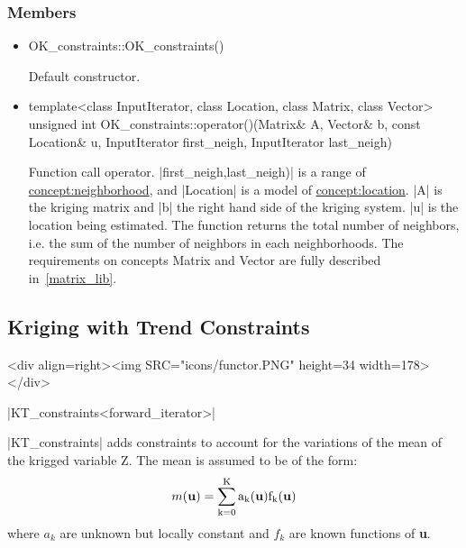 \documentclass[12pt,twoside]{report}
\newcommand{\loc}[1]{{\bf #1}}
\newcommand{\mloc}[1]{\rm{\bf #1}}
\begin{document}
 
\htmlrule[CLEAR=all]  \subsubsection*{Members}
\begin{itemize}

\item
 \begin{code} 
OK_constraints::OK_constraints()
\end{code}

Default constructor.

\item
 \begin{code} 
template<class InputIterator, class Location, class Matrix, class Vector>
unsigned int
OK_constraints::operator()(Matrix& A, Vector& b,
                           const Location& u,
                           InputIterator first_neigh, InputIterator last_neigh)
                            
\end{code}

Function call operator. |first_neigh,last_neigh)| is a range of \hyperref{Neighborhood}{Neighborhood (see Section}{)}{concept:neighborhood}, and |Location| is a model of \hyperref{Location}{Location (see Section}{)}{concept:location}. |A| is the kriging matrix and |b| the right hand side of the kriging system. |u| is the location being estimated. The function returns the total number of neighbors, i.e. the sum of the number of neighbors in each neighborhoods. The requirements on concepts Matrix and Vector are fully described in~\ref{matrix_lib}.
\end{itemize}









\subsection{Kriging with Trend Constraints}
\begin{htmlonly}
<div align=right><img SRC="icons/functor.PNG" height=34 width=178></div>
\end{htmlonly}

|KT_constraints<forward_iterator>|
\vspace{0.3cm}

|KT_constraints| adds constraints to account for the variations of the mean of the krigged variable Z. The mean is assumed to be of the form:
\begin{displaymath}
    m(\mloc{u}) = \sum_{k=0}^K a_k(\mloc{u}) f_k(\mloc{u})
  \end{displaymath}
\noindent where $a_k$ are unknown but locally constant and $f_k$ are known functions of \loc{u}.
\end{document}

